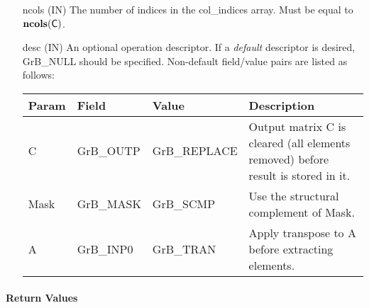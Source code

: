 \begin{itemize}[leftmargin=1in]
    \item[{\sf ncols}] ({\sf IN}) The number of indices in the {\sf col\_indices}
    array.  Must be equal to $\bold{ncols}({\sf C})$.

    \item[{\sf desc}] ({\sf IN}) An optional operation descriptor. If
    a \emph{default} descriptor is desired, {\sf GrB\_NULL} should be
    specified. Non-default field/value pairs are listed as follows:  \\

    \begin{tabular}{lllp{2.5in}}
        Param & Field  & Value & Description \\
        \hline
        {\sf C}    & {\sf GrB\_OUTP} & {\sf GrB\_REPLACE} & Output matrix {\sf C} 
        is cleared (all elements removed) before result is stored in it. \\
    
        {\sf Mask} & {\sf GrB\_MASK} & {\sf GrB\_SCMP}   & Use the structural 
        complement of {\sf Mask}. \\
    
        {\sf A}    & {\sf GrB\_INP0} & {\sf GrB\_TRAN}   & Apply transpose to 
        {\sf A} before extracting elements. \\
    \end{tabular}
\end{itemize}

\paragraph{Return Values}

